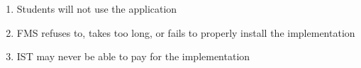 \begin{enumerate}
	\item Students will not use the application
	\item FMS refuses to, takes too long, or fails to properly install the implementation
	\item IST may never be able to pay for the implementation
\end{enumerate}
